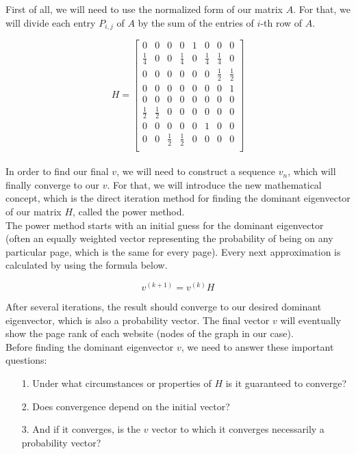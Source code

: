 \documentclass{article}
\begin{document}
First of all, we will need to use the normalized form of our matrix \( A \). For that, we will divide each entry \( P_{i,j} \) of \( A \) by the sum of the entries of \( i \)-th row of \( A \).

\[
H = \begin{bmatrix}
0 & 0 & 0 & 0 & 1 & 0 & 0 & 0 \\
\frac{1}{4} & 0 & 0 & \frac{1}{4} & 0 & \frac{1}{4} & \frac{1}{4} & 0 \\
0 & 0 & 0 & 0 & 0 & 0 & \frac{1}{2} & \frac{1}{2} \\
0 & 0 & 0 & 0 & 0 & 0 & 0 & 1 \\
0 & 0 & 0 & 0 & 0 & 0 & 0 & 0 \\
\frac{1}{2} & \frac{1}{2} & 0 & 0 & 0 & 0 & 0 & 0 \\
0 & 0 & 0 & 0 & 0 & 1 & 0 & 0 \\
0 & 0 & \frac{1}{2} & \frac{1}{2} & 0 & 0 & 0 & 0 \\
\end{bmatrix}
\]
\\

In order to find our final \( v \), we will need to construct a sequence \( v_n \), which will finally converge to our \( v \). For that, we will introduce the new mathematical concept, which is the direct iteration method for finding the dominant eigenvector of our matrix \( H \), called the power method.
\\ 

The power method starts with an initial guess for the dominant eigenvector (often an equally weighted vector representing the probability of being on any particular page, which is the same for every page). Every next approximation is calculated by using the formula below.

\[ v^{(k+1)} = v^{(k)} H \]

After several iterations, the result should converge to our desired dominant eigenvector, which is also a probability vector. The final vector \( v \) will eventually show the page rank of each website (nodes of the graph in our case).
\\

Before finding the dominant eigenvector \( v \), we need to answer these important questions:
\\

\begin{itemize}
    \item[1.] Under what circumstances or properties of \( H \) is it guaranteed to converge?
    \item[2.] Does convergence depend on the initial vector?
    \item[3.] And if it converges, is the \( v \) vector to which it converges necessarily a probability vector?
\end{itemize}
\end{document}

